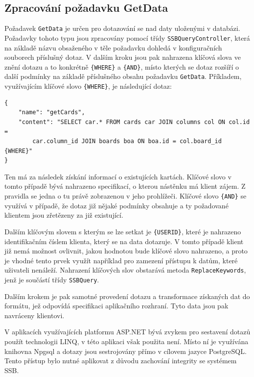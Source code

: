 \subsection{Zpracování požadavku GetData}
Požadavek \texttt{GetData} je určen pro dotazování se nad daty uloženými v databázi. Požadavky tohoto typu jsou zpracovány pomocí třídy \texttt{SSBQueryController}, která na základě názvu obsaženého v těle požadavku dohledá v konfiguračních souborech příslušný dotaz. V dalším kroku jsou pak nahrazena klíčová slova ve znění dotazu a to konkrétně \texttt{\{WHERE\}} a \texttt{\{AND\}}, místo kterých se dotaz rozšíří o další podmínky na základě příslušného obsahu požadavku \texttt{GetData}. Příkladem, využívajícím klíčové slovo \texttt{\{WHERE\}}, je následující dotaz:

\begin{verbatim}
{
    "name": "getCards",
    "content": "SELECT car.* FROM cards car JOIN columns col ON col.id = 
        car.column_id JOIN boards boa ON boa.id = col.board_id {WHERE}"
}
\end{verbatim}

Ten má za následek získání informací o existujících kartách. Klíčové slovo v tomto případě bývá nahrazeno specifikací, o kterou nástěnku má klient zájem. Z pravidla se jedna o tu právě zobrazenou v jeho prohlížeči. Klíčové slovo \texttt{\{AND\}} se využívá v případě, že dotaz již nějaké podmínky obsahuje a ty požadované klientem jsou zřetězeny za již existující.

Dalším klíčovým slovem s kterým se lze setkat je \texttt{\{USERID\}}, které je nahrazeno identifikačním číslem klienta, který se na data dotazuje. V tomto případě klient již nemá možnost ovlivnit, jakou hodnotou bude klíčové slovo nahrazeno, a proto je vhodné tento prvek využít například pro zamezení přístupu k datům, které uživateli nenáleží.
Nahrazení klíčových slov obstarává metoda \texttt{ReplaceKeywords}, jenž je součástí třídy \texttt{SSBQuery}.

Dalším krokem je pak samotné provedení dotazu a transformace získaných dat do formátu, jež odpovídá specifikaci aplikačního rozhraní. Tyto data jsou pak navráceny klientovi.

V aplikacích využívajících platformu ASP.NET bývá zvykem pro sestavení dotazů použít technologii LINQ, v této aplikaci však použita není. Místo ní je využívána knihovna Npgsql a dotazy jsou sestrojovány přímo v cílovem jazyce PostgreSQL. Tento přístup bylo nutné aplikovat z důvodu zachování integrity se systémem SSB.


